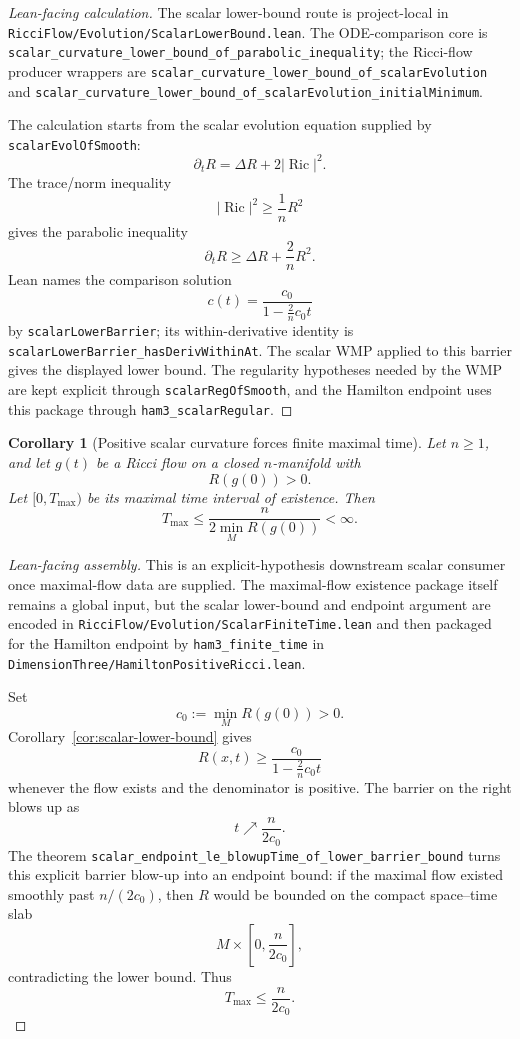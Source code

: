 \documentclass[11pt]{article}
\theoremstyle{plain}
\newtheorem{corollary}[theorem]{Corollary}
\theoremstyle{definition}
\theoremstyle{remark}
\newcommand{\Ric}{\operatorname{Ric}}
\newcommand{\norm}[1]{\left|#1\right|}
\newcommand{\leanref}[1]{\nolinkurl{#1}}
\newcommand{\leanfile}[1]{\nolinkurl{#1}}
\newcommand{\rffile}[1]{\leanfile{#1}}
\begin{document}
\begin{proof}[Lean-facing calculation]
The scalar lower-bound route is project-local in
\rffile{RicciFlow/Evolution/ScalarLowerBound.lean}.  The ODE-comparison core is
\leanref{scalar_curvature_lower_bound_of_parabolic_inequality}; the Ricci-flow
producer wrappers are
\leanref{scalar_curvature_lower_bound_of_scalarEvolution} and
\leanref{scalar_curvature_lower_bound_of_scalarEvolution_initialMinimum}.

The calculation starts from the scalar evolution equation supplied by
\leanref{scalarEvolOfSmooth}:
\[
  \partial_tR=\Delta R+2\norm{\Ric}^2.
\]
The trace/norm inequality
\[
  \norm{\Ric}^2\ge \frac1n R^2
\]
gives the parabolic inequality
\[
  \partial_tR
  \ge
  \Delta R+\frac2nR^2.
\]
Lean names the comparison solution
\[
  c(t)=\frac{c_0}{1-\frac2n c_0t}
\]
by \leanref{scalarLowerBarrier}; its within-derivative identity is
\leanref{scalarLowerBarrier_hasDerivWithinAt}.  The scalar WMP applied to this
barrier gives the displayed lower bound.  The regularity hypotheses needed by
the WMP are kept explicit through \leanref{scalarRegOfSmooth}, and the Hamilton
endpoint uses this package through \leanref{ham3_scalarRegular}.
\end{proof}

\begin{corollary}[Positive scalar curvature forces finite maximal time]
\label{cor:positive-scalar-finite-time}
Let $n\ge1$, and let $g(t)$ be a Ricci flow on a closed $n$-manifold with
\[
R(g(0))>0.
\]
Let $[0,T_{\max})$ be its maximal time interval of existence. Then
\[
T_{\max}
\le
\frac{n}{2\min_M R(g(0))}
<\infty .
\]
\end{corollary}

\begin{proof}[Lean-facing assembly]
This is an explicit-hypothesis downstream scalar consumer once maximal-flow
data are supplied.  The maximal-flow
existence package itself remains a global input, but the scalar lower-bound and
endpoint argument are encoded in
\rffile{RicciFlow/Evolution/ScalarFiniteTime.lean} and then packaged for the
Hamilton endpoint by \leanref{ham3_finite_time} in
\rffile{DimensionThree/HamiltonPositiveRicci.lean}.

Set
\[
  c_0:=\min_M R(g(0))>0.
\]
Corollary~\ref{cor:scalar-lower-bound} gives
\[
  R(x,t)\ge \frac{c_0}{1-\frac2n c_0t}
\]
whenever the flow exists and the denominator is positive.  The barrier on the
right blows up as
\[
  t\nearrow \frac{n}{2c_0}.
\]
The theorem \leanref{scalar_endpoint_le_blowupTime_of_lower_barrier_bound}
turns this explicit barrier blow-up into an endpoint bound: if the maximal flow
existed smoothly past $n/(2c_0)$, then $R$ would be bounded on the compact
space--time slab
\[
  M\times\left[0,\frac{n}{2c_0}\right],
\]
contradicting the lower bound.  Thus
\[
  T_{\max}\le \frac{n}{2c_0}.
\]
\end{proof}
\end{document}

